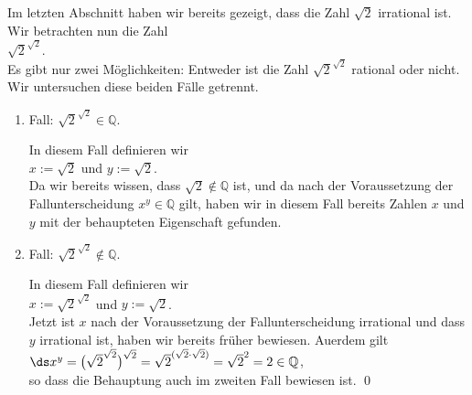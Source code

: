 \proof
Im letzten Abschnitt haben wir bereits gezeigt, dass die Zahl $\sqrt{2}$ irrational ist.  Wir
betrachten nun die Zahl 
\\[0.2cm]
\hspace*{1.3cm}
$\sqrt{2}^{\sqrt{2}}$.
\\[0.2cm]
Es gibt nur zwei M\"{o}glichkeiten: Entweder ist die Zahl $\sqrt{2}^{\sqrt{2}}$ rational oder nicht.  Wir
untersuchen diese beiden F\"{a}lle getrennt.
\begin{enumerate}
\item Fall: $\sqrt{2}^{\sqrt{2}} \in \mathbb{Q}$.

      In diesem Fall definieren wir
      \\[0.2cm]
      \hspace*{1.3cm}
      $x := \sqrt{2}$ \quad und \quad $y := \sqrt{2}$.  
      \\[0.2cm]
      Da wir bereits wissen,
      dass $\sqrt{2} \not\in \mathbb{Q}$ ist, und da nach der Voraussetzung der
      Fallunterscheidung $x^y \in \mathbb{Q}$ gilt, haben wir in diesem Fall bereits Zahlen $x$ und
      $y$ mit der behaupteten Eigenschaft gefunden.
\item Fall:  $\sqrt{2}^{\sqrt{2}} \not\in \mathbb{Q}$.

      In diesem Fall definieren wir 
      \\[0.2cm]
      \hspace*{1.3cm}
      $x := \sqrt{2}^{\sqrt{2}}$ \quad und \quad $y := \sqrt{2}$.
      \\[0.2cm]
      Jetzt ist $x$ nach der Voraussetzung der Fallunterscheidung irrational und dass $y$ irrational
      ist, haben wir bereits fr\"{u}her bewiesen.  Au\3erdem gilt
      \\[0.2cm]
      \hspace*{1.3cm}
      $\ds x^y = \bigl(\sqrt{2}^{\sqrt{2}}\bigr)^{\sqrt{2}} = \sqrt{2}^{(\sqrt{2} \cdot \sqrt{2})} = \sqrt{2}^{2} = 2 \in \mathbb{Q}$,
      \\[0.2cm]
      so dass die Behauptung auch im zweiten Fall bewiesen ist.  \qed
\end{enumerate}


